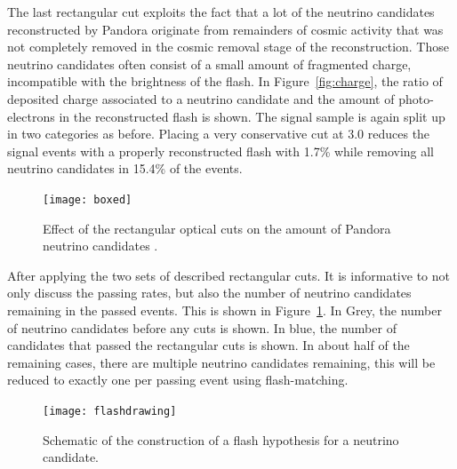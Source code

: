 The last rectangular cut exploits the fact that a lot of the neutrino candidates reconstructed by Pandora originate from remainders of cosmic activity that was not completely removed in the cosmic removal stage of the reconstruction. Those neutrino candidates often consist of a small amount of fragmented charge, incompatible with the brightness of the flash. In Figure~\ref{fig:charge}, the ratio of deposited charge associated to a neutrino candidate and the  amount of photo-electrons in the reconstructed flash is shown. The signal sample is again split up in two categories as before. Placing a very conservative cut at 3.0 reduces the signal events with a properly reconstructed flash with 1.7\% while removing all neutrino candidates in 15.4\% of the events. 

\begin{figure}[!htbp]
\centering
\texttt{[image: boxed]}
\caption{Effect of the rectangular optical cuts on the amount of Pandora neutrino candidates .} 
\label{fig:boxed}
\end{figure}

After applying the two sets of described rectangular cuts. It is informative to not only discuss the passing rates, but also the number of neutrino candidates remaining in the passed events. This is shown in Figure~\ref{fig:boxed}. In Grey, the number of neutrino candidates before any cuts is shown. In blue, the number of candidates that passed the rectangular cuts is shown. In about half of the remaining cases, there are multiple neutrino candidates remaining, this will be reduced to exactly one per passing event using flash-matching. 

\begin{figure}[!htbp]
\centering
\texttt{[image: flashdrawing]} 
\caption{Schematic of the construction of a flash hypothesis for a neutrino candidate.} 
\label{fig:flashdrawing}
\end{figure}

